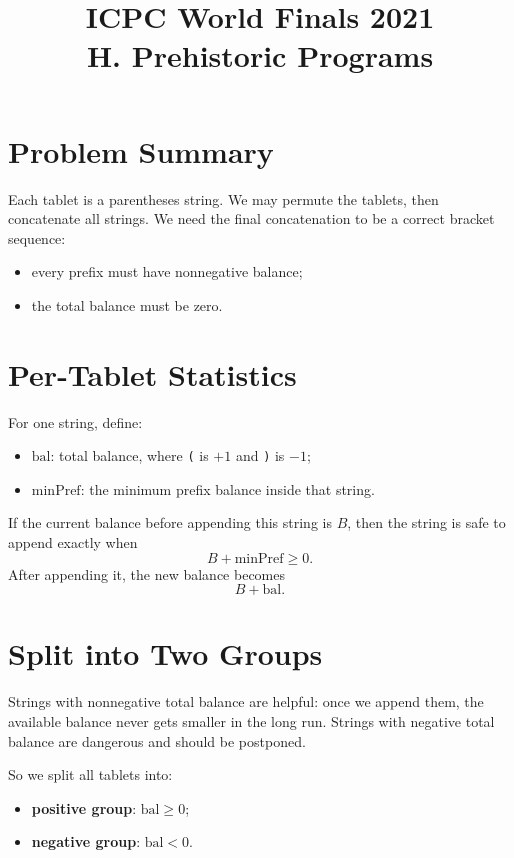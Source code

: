 \documentclass[11pt]{article}
\title{ICPC World Finals 2021\\H. Prehistoric Programs}
\author{}
\date{}
\begin{document}
\maketitle

\section*{Problem Summary}

Each tablet is a parentheses string. We may permute the tablets, then concatenate all strings. We need
the final concatenation to be a correct bracket sequence:
\begin{itemize}[leftmargin=*]
    \item every prefix must have nonnegative balance;
    \item the total balance must be zero.
\end{itemize}

\section*{Per-Tablet Statistics}

For one string, define:
\begin{itemize}[leftmargin=*]
    \item $\text{bal}$: total balance, where \texttt{(} is $+1$ and \texttt{)} is $-1$;
    \item $\text{minPref}$: the minimum prefix balance inside that string.
\end{itemize}

If the current balance before appending this string is $B$, then the string is safe to append exactly when
\[
    B + \text{minPref} \ge 0.
\]
After appending it, the new balance becomes
\[
    B + \text{bal}.
\]

\section*{Split into Two Groups}

Strings with nonnegative total balance are helpful: once we append them, the available balance never gets
smaller in the long run. Strings with negative total balance are dangerous and should be postponed.

So we split all tablets into:
\begin{itemize}[leftmargin=*]
    \item \textbf{positive group}: $\text{bal} \ge 0$;
    \item \textbf{negative group}: $\text{bal} < 0$.
\end{itemize}
\end{document}
